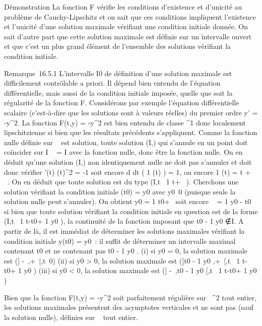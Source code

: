 Démonstration La fonction F vérifie les conditions d'existence et
d'unicité au problème de Cauchy-Lipschitz et on sait que ces conditions
impliquent l'existence et l'unicité d'une solution maximale vérifiant
une condition initiale donnée. On sait d'autre part que cette solution
maximale est définie sur un intervalle ouvert et que c'est un plus grand
élément de l'ensemble des solutions vérifiant la condition initiale.

Remarque~16.5.1 L'intervalle I0 de définition d'une solution
maximale est difficilement contrôlable a priori. Il dépend bien entendu
de l'équation différentielle, mais aussi de la condition initiale
imposée, quelle que soit la régularité de la fonction F. Considérons par
exemple l'équation différentielle scalaire (c'est-à-dire que les
solutions sont à valeurs réelles) du premier ordre y' = -y^2.
La fonction F(t,y) = -y^2 est bien entendu de classe
^1 donc localement lipschitzienne si bien que les résultats
précédents s'appliquent. Comme la fonction nulle définie sur ~ est
solution, toute solution (I,\phi) qui s'annule en un point doit coïncider
sur I \bigcap {}~ = I avec la fonction nulle, donc être la fonction nulle. On en
déduit qu'une solution (I,\phi) non identiquement nulle ne doit pas
s'annuler et doit donc vérifier  \phi'(t) \over
\phi(t)^2 = -1 soit encore  d \over dt
\left ( 1 \over \phi(t)
\right ) = 1, ou encore  1 \over \phi(t)
= t + \lambda~. On en déduit que toute solution est du type
(I,t\mapsto~ 1 \over t+\lambda~ ).
Cherchons une solution vérifiant la condition initiale \phi(t0) =
y0 avec y0\neq~0 (puisque
seule la solution nulle peut s'annuler). On obtient y0 = 1
\over t0+\lambda~ soit encore \lambda~ = 1
\over y0 - t0 si bien que toute
solution vérifiant la condition initiale en question est de la forme
(I,t\mapsto~ 1 \over
t-t0+ 1 \over y0  ), la
continuité de la fonction imposant que t0 - 1
\over y0 ∉I. A
partir de là, il est immédiat de déterminer les solutions maximales
vérifiant la condition initiale y(t0) = y0~: il
suffit de déterminer un intervalle maximal contenant t0 et ne
contenant pas t0 - 1 \over y0 .
(i) si y0 = 0, la solution maximale est ({]}
-\infty~,+\infty~{[},t\mapsto~0) (ii) si y0
\textgreater{} 0, la solution maximale est ({]}t0 - 1
\over y0
,+\infty~{[},t\mapsto~ 1 \over
t-t0+ 1 \over y0  ) (iii) si
y0 \textless{} 0, la solution maximale est ({]}
-\infty~,t0 - 1 \over y0
{[},t\mapsto~ 1 \over
t-t0+ 1 \over y0  )

Bien que la fonction F(t,y) = -y^2 soit parfaitement
régulière sur ~^2 tout entier, les solutions maximales
présentent des asymptotes verticales et ne sont pas (sauf la solution
nulle), définies sur ~ tout entier.

